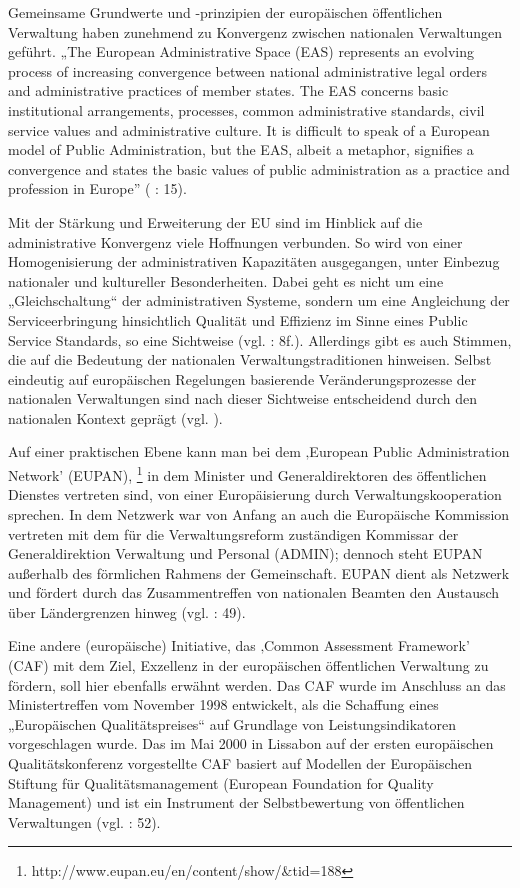 Gemeinsame Grundwerte und -prinzipien der europäischen öffentlichen Verwaltung haben zunehmend zu Konvergenz zwischen nationalen Verwaltungen geführt. „The European Administrative Space (EAS) represents an evolving process of increasing convergence between national administrative legal orders and administrative practices of member states. The EAS concerns basic institutional arrangements, processes, common administrative standards, civil service values and administrative culture. It is difficult to speak of a European model of Public Administration, but the EAS, albeit a metaphor, signifies a convergence and states the basic values of public administration as a practice and profession in Europe” (\cite{oecd99} : 15). \par
Mit der Stärkung und Erweiterung der EU sind im Hinblick auf die administrative Konvergenz viele Hoffnungen verbunden. So wird von einer Homogenisierung der administrativen Kapazitäten ausgegangen, unter Einbezug nationaler und kultureller Besonderheiten. Dabei geht es nicht um eine „Gleichschaltung“ der administrativen Systeme, sondern um eine Angleichung der Serviceerbringung hinsichtlich Qualität und Effizienz im Sinne eines Public Service Standards, so eine Sichtweise (vgl. \cite{dorta} : 8f.). Allerdings gibt es auch Stimmen, die auf die Bedeutung der nationalen Verwaltungstraditionen hinweisen. Selbst eindeutig auf europäischen Regelungen basierende Veränderungsprozesse der nationalen Verwaltungen sind nach dieser Sichtweise entscheidend durch den nationalen Kontext geprägt (vgl. \cite{herit}).\par
Auf einer praktischen Ebene kann man bei dem ‚European Public Administration Network' (EUPAN), \footnote{http://www.eupan.eu/en/content/show/\&tid=188} in dem Minister und Generaldirektoren des öffentlichen Dienstes vertreten sind, von einer Europäisierung durch Verwaltungskooperation sprechen. In dem Netzwerk war von Anfang an auch die Europäische Kommission vertreten mit dem für die Verwaltungsreform zuständigen Kommissar der Generaldirektion Verwaltung und Personal (ADMIN); dennoch steht EUPAN außerhalb des förmlichen Rahmens der Gemeinschaft. EUPAN dient als Netzwerk und fördert durch das Zusammentreffen von nationalen Beamten den Austausch über Ländergrenzen hinweg (vgl. \cite{mangenot} : 49).\par
Eine andere (europäische) Initiative, das ‚Common Assessment Framework’ (CAF) mit dem Ziel, Exzellenz in der europäischen öffentlichen Verwaltung zu fördern, soll hier ebenfalls erwähnt werden. Das CAF wurde im Anschluss an das Ministertreffen vom November 1998 entwickelt, als die Schaffung eines „Europäischen Qualitätspreises“ auf Grundlage von Leistungsindikatoren vorgeschlagen wurde. Das im Mai 2000 in Lissabon auf der ersten europäischen Qualitätskonferenz vorgestellte CAF basiert auf Modellen der Europäischen Stiftung für Qualitätsmanagement (European Foundation for Quality Management) und ist ein Instrument der Selbstbewertung von öffentlichen Verwaltungen (vgl. \cite{mangenot} : 52).\par
